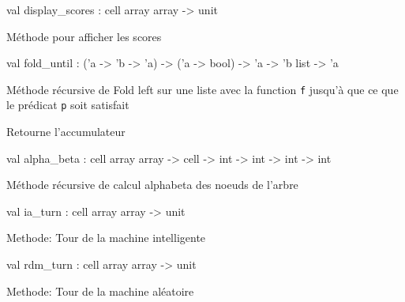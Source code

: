 \documentclass[11pt]{article}
\begin{document}
\label{val:Othello.display-underscorescores}\begin{ocamldoccode}
val display_scores : cell array array -> unit
\end{ocamldoccode}
\begin{ocamldocdescription}
Méthode pour afficher les scores


\end{ocamldocdescription}




\label{val:Othello.fold-underscoreuntil}\begin{ocamldoccode}
val fold_until : ('a -> 'b -> 'a) -> ('a -> bool) -> 'a -> 'b list -> 'a
\end{ocamldoccode}
\begin{ocamldocdescription}
Méthode récursive de Fold left sur une liste avec la function {\tt{f}} 
   jusqu'à que ce que le prédicat {\tt{p}} soit satisfait


\end{ocamldocdescription}




Retourne l'accumulateur



\label{val:Othello.alpha-underscorebeta}\begin{ocamldoccode}
val alpha_beta : cell array array -> cell -> int -> int -> int -> int
\end{ocamldoccode}
\begin{ocamldocdescription}
Méthode récursive de calcul alphabeta des noeuds de l'arbre


\end{ocamldocdescription}




\label{val:Othello.ia-underscoreturn}\begin{ocamldoccode}
val ia_turn : cell array array -> unit
\end{ocamldoccode}
\begin{ocamldocdescription}
Methode: Tour de la machine intelligente


\end{ocamldocdescription}




\label{val:Othello.rdm-underscoreturn}\begin{ocamldoccode}
val rdm_turn : cell array array -> unit
\end{ocamldoccode}
\begin{ocamldocdescription}
Methode: Tour de la machine aléatoire


\end{ocamldocdescription}
\end{document}
